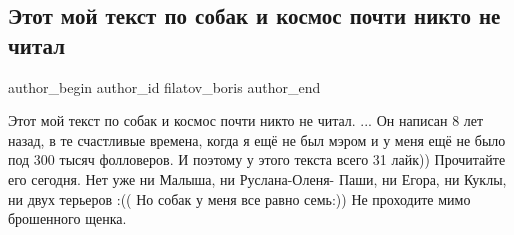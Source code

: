  
 
 
 
 
 
\subsection{Этот мой текст по собак и космос почти никто не читал}
\label{sec:04_11_2021.fb.filatov_boris.1.post_pro_sobak}
 
\ifcmt
 author_begin
   author_id filatov_boris
 author_end
\fi

\obeycr
Этот мой текст по собак и космос почти никто не читал.
...
Он написан 8 лет назад, в те счастливые времена, когда я ещё не был мэром и у меня ещё не было под 300 тысяч фолловеров. 
И поэтому у этого текста всего 31 лайк))
Прочитайте его сегодня. 
Нет уже ни Малыша, ни Руслана-Оленя- Паши, ни Егора, ни Куклы, ни двух терьеров :((
Но собак у меня все равно семь:))
Не проходите мимо брошенного щенка.
\restorecr


